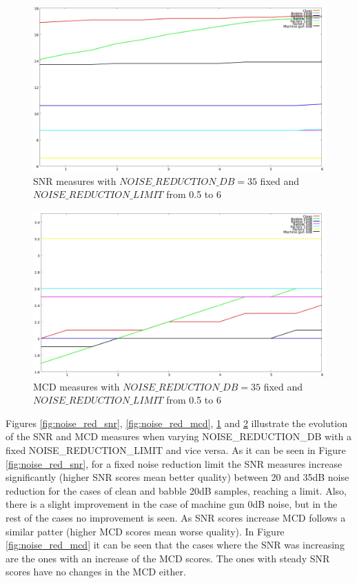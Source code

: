 \begin{figure}[!htb]
\begin{centering}
\includegraphics[width=\textwidth]{images/noise_red_lim_snr_exp.jpg}
\caption{SNR measures with $NOISE\_REDUCTION\_DB = 35$ fixed and $NOISE\_REDUCTION\_LIMIT$ from 0.5 to 6}
\label{fig:noise_red_lim_snr}
\end{centering}
\end{figure}

\begin{figure}[!htb]
\begin{centering}
\includegraphics[width=\textwidth]{images/noise_red_lim_mcd_exp.jpg}
\caption{MCD measures with $NOISE\_REDUCTION\_DB = 35$ fixed and $NOISE\_REDUCTION\_LIMIT$ from 0.5 to 6}
\label{fig:noise_red_lim_mcd}
\end{centering}
\end{figure}
Figures \ref{fig:noise_red_snr}, \ref{fig:noise_red_mcd}, \ref{fig:noise_red_lim_snr} and \ref{fig:noise_red_lim_mcd} illustrate the evolution of the SNR and MCD measures when varying NOISE\_REDUCTION\_DB with a fixed NOISE\_REDUCTION\_LIMIT and vice versa.
%
As it can be seen in Figure \ref{fig:noise_red_snr}, for a fixed noise reduction limit the SNR measures increase significantly (higher SNR scores mean better quality) between 20 and 35dB noise reduction for the cases of clean and babble 20dB samples, reaching a limit.
%
Also, there is a slight improvement in the case of machine gun 0dB noise, but in the rest of the cases no improvement is seen.
%
As SNR scores increase MCD follows a similar patter (higher MCD scores mean worse quality).
%
In Figure \ref{fig:noise_red_mcd} it can be seen that the cases where the SNR was increasing are the ones with an increase of the MCD scores.
%
The ones with steady SNR scores have no changes in the MCD either.

